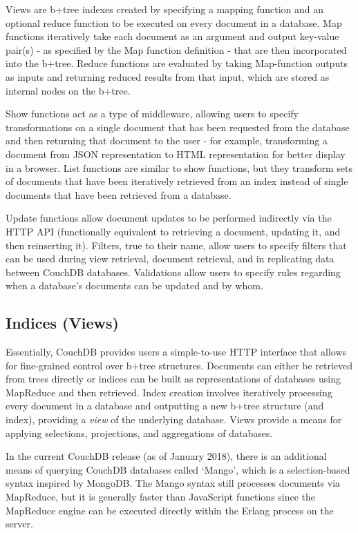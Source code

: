 Views are b+tree indexes created by specifying a mapping function and an optional reduce function to be executed on every document in a database. Map functions iteratively take each document as an argument and output key-value pair(s) - as specified by the Map function definition - that are then incorporated into the b+tree. Reduce functions are evaluated by taking Map-function outputs as inputs and returning reduced results from that input, which are stored as internal nodes on the b+tree.

Show functions act as a type of middleware, allowing users to specify transformations on a single document that has been requested from the database and then returning that document to the user - for example, transforming a document from JSON representation to HTML representation for better display in a browser. List functions are similar to show functions, but they transform sets of documents that have been iteratively retrieved from an index instead of single documents that have been retrieved from a database.

Update functions allow document updates to be performed indirectly via the HTTP API (functionally equivalent to retrieving a document, updating it, and then reinserting it). Filters, true to their name, allow users to specify filters that can be used during view retrieval, document retrieval, and in replicating data between CouchDB databases. Validations allow users to specify rules regarding when a database’s documents can be updated and by whom.

\subsection{Indices (Views)}
Essentially, CouchDB provides users a simple-to-use HTTP interface that allows for fine-grained control over b+tree structures. Documents can either be retrieved from trees directly or indices can be built as representations of databases using MapReduce and then retrieved. Index creation involves iteratively processing every document in a database and outputting a new b+tree structure (and index), providing a \textit{view} of the underlying database. Views provide a means for applying selections, projections, and aggregations of databases.

In the current CouchDB release (as of January 2018), there is an additional means of querying CouchDB databases called `Mango', which is a selection-based syntax inspired by MongoDB. The Mango syntax still processes documents via MapReduce, but it is generally faster than JavaScript functions since the MapReduce engine can be executed directly within the Erlang process on the server.

